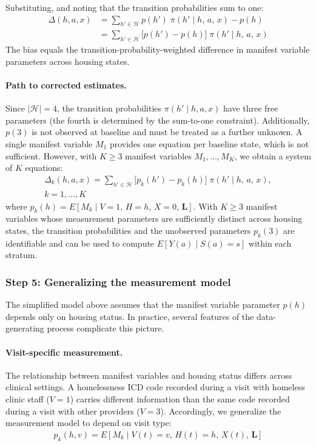Substituting, and noting that the transition probabilities sum to one:
\begin{align*}
    \Delta(h, a, x) &= \sum_{h' \in \mathcal{H}} p(h') \; \pi(h' \mid h,\, a,\, x) - p(h) \\
    &= \sum_{h' \in \mathcal{H}} \big[p(h') - p(h)\big] \; \pi(h' \mid h,\, a,\, x)
\end{align*}
The bias equals the transition-probability-weighted difference in manifest variable parameters across housing states.

\paragraph{Path to corrected estimates.} Since $|\mathcal{H}|=4$, the transition probabilities $\pi(h' \mid h, a, x)$ have three free parameters (the fourth is determined by the sum-to-one constraint). Additionally, $p(3)$ is not observed at baseline and must be treated as a further unknown. A single manifest variable $M_1$ provides one equation per baseline state, which is not sufficient. However, with $K \geq 3$ manifest variables $M_1, \ldots, M_K$, we obtain a system of $K$ equations:
\begin{multline*}
    \Delta_k(h, a, x) = \sum_{h' \in \mathcal{H}} \big[p_k(h') - p_k(h)\big] \; \pi(h' \mid h,\, a,\, x), \\
    k=1,\ldots,K
\end{multline*}
where $p_k(h) = E[M_k \mid V=1,\, H=h,\, X=0,\, \boldsymbol{L}]$. With $K \geq 3$ manifest variables whose measurement parameters are sufficiently distinct across housing states, the transition probabilities and the unobserved parameters $p_k(3)$ are identifiable and can be used to compute $E[Y(a) \mid S(a)=s]$ within each stratum.

\subsubsection{Step 5: Generalizing the measurement model}

The simplified model above assumes that the manifest variable parameter $p(h)$ depends only on housing status. In practice, several features of the data-generating process complicate this picture.

\paragraph{Visit-specific measurement.} The relationship between manifest variables and housing status differs across clinical settings. A homelessness ICD code recorded during a visit with homeless clinic staff ($V=1$) carries different information than the same code recorded during a visit with other providers ($V=3$). Accordingly, we generalize the measurement model to depend on visit type:
\begin{align*}
    p_k(h, v) = E[M_k \mid V(t)=v,\, H(t)=h,\, X(t),\, \boldsymbol{L}]
\end{align*}

